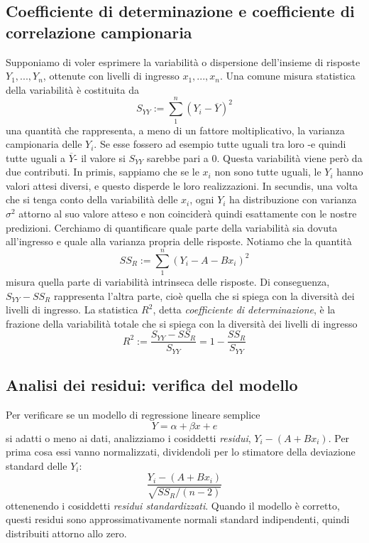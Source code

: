 \documentclass[11pt]{article}
\begin{document}
\subsection{Coefficiente di determinazione e coefficiente di correlazione campionaria}
Supponiamo di voler esprimere la variabilità o dispersione dell'insieme di risposte $Y_1,...,Y_n$, ottenute con livelli di ingresso $x_1,...,x_n$. Una comune misura statistica della variabilità è costituita da 
\begin{displaymath}
    S_{YY} := \sum_1^n (Y_i-\overline{Y})^2
\end{displaymath}
una quantità che rappresenta, a meno di un fattore moltiplicativo, la varianza campionaria delle $Y_i$. Se esse fossero ad esempio tutte uguali tra loro -e quindi tutte uguali a $\overline{Y}$- il valore si $S_{YY}$ sarebbe pari a 0.
Questa variabilità viene però da due contributi. In primis, sappiamo che se le $x_i$ non sono tutte uguali, le $Y_i$ hanno valori attesi diversi, e questo disperde le loro realizzazioni. In secundis, una volta che si tenga conto della variabilità delle $x_i$, ogni $Y_i$ ha distribuzione con varianza $\sigma^2$ attorno al suo valore atteso e non coinciderà quindi esattamente con le nostre predizioni. Cerchiamo di quantificare quale parte della variabilità sia dovuta all'ingresso e quale alla varianza propria delle risposte. Notiamo che la quantità
\begin{displaymath}
    SS_R := \sum_1^n (Y_i-A-Bx_i)^2
\end{displaymath}
misura quella parte di variabilità intrinseca delle risposte. Di conseguenza, $S_{YY}- SS_R$ rappresenta l'altra parte, cioè quella che si spiega con la diversità dei livelli di ingresso. La statistica $R^2$, detta \textit{coefficiente di determinazione}, è la frazione della variabilità totale che si spiega con la diversità dei livelli di ingresso
\begin{displaymath}
    R^2 := \frac{S_{YY}-SS_R}{S_{YY}} = 1-\frac{SS_R}{S_{YY}}
\end{displaymath}
\subsection{Analisi dei residui: verifica del modello}
Per verificare se un modello di regressione lineare semplice
\begin{displaymath}
    Y=\alpha+\beta x + e
\end{displaymath}
si adatti o meno ai dati, analizziamo i cosiddetti \textit{residui}, $Y_i-(A+Bx_i)$. Per prima cosa essi vanno normalizzati, dividendoli per lo stimatore della deviazione standard delle $Y_i$:
\begin{displaymath}
    \frac{Y_i-(A+Bx_i)}{\sqrt{SS_R/(n-2)}}
\end{displaymath}
ottenenendo i cosiddetti \textit{residui standardizzati}. Quando il modello è corretto, questi residui sono approssimativamente normali standard indipendenti, quindi distribuiti attorno allo zero. 
\end{document}
